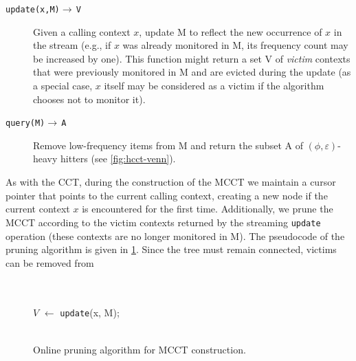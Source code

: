 \begin{description}
\item[{\tt update(x,M)}$\rightarrow\,${\tt V}] Given a calling context $x$, update M to reflect the new occurrence of $x$ in the stream (e.g., if $x$ was already monitored in M, its frequency count may be increased by one). This function might return a set V of {\em victim} contexts that were previously monitored in M and are evicted during the update (as a special case, $x$ itself may be considered as a victim if the algorithm chooses not to monitor it).
\item[{\tt query(M)}$\rightarrow\,${\tt A}] Remove low-frequency items from M and return the subset A of $(\phi,\varepsilon)$-heavy hitters (see \myfigure\ref{fig:hcct-venn}).
\end{description}

\ifauthorea{}{\par\begingroup \parfillskip 0pt \relax}
\noindent As with the CCT, during the construction of the MCCT we maintain a cursor pointer that points to the current calling context, creating a new node if the current context $x$ is encountered for the first time. Additionally, we prune the MCCT according to the victim contexts returned by the streaming {\tt update} operation (these contexts are no longer monitored in M). The pseudocode of the pruning algorithm is given in \myalgorithm\ref{alg:hcct-update}. Since the tree must remain connected, victims can be removed from
\ifauthorea{}{\par\endgroup}
\ifdefined\noauthorea

\begin{figure}[h!]
\IncMargin{2em}
\begin{algorithm}[H]
\LinesNumbered
\SetAlgoNoLine
\SetNlSkip{1.5em} 
\Indm\Indmm
\nonl\hrulefill\\
\vspace{-2mm}\hrulefill\\
\Indp\Indpp
$V$ $\gets$ {\tt update}(x, M);\\
\vspace{-2mm}
\Indm\Indmm
\nonl\hrulefill\vspace{1mm}\\
\DecMargin{2em}
\caption{\label{alg:hcct-update} Online pruning algorithm for MCCT construction.}
\end{algorithm}
\end{figure}


